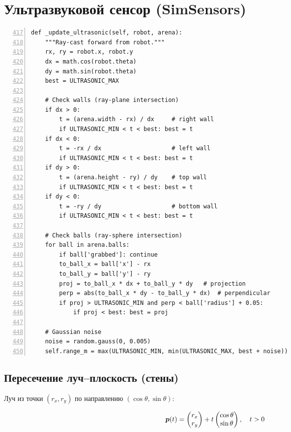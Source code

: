 \section{Ультразвуковой сенсор (SimSensors)}

\begin{filebox}[title={\filepath{simulator.py}, строки 417--464 --- \_update\_ultrasonic()}]
\begin{lstlisting}[style=pythonstyle, numbers=left, firstnumber=417]
def _update_ultrasonic(self, robot, arena):
    """Ray-cast forward from robot."""
    rx, ry = robot.x, robot.y
    dx = math.cos(robot.theta)
    dy = math.sin(robot.theta)
    best = ULTRASONIC_MAX

    # Check walls (ray-plane intersection)
    if dx > 0:
        t = (arena.width - rx) / dx     # right wall
        if ULTRASONIC_MIN < t < best: best = t
    if dx < 0:
        t = -rx / dx                    # left wall
        if ULTRASONIC_MIN < t < best: best = t
    if dy > 0:
        t = (arena.height - ry) / dy    # top wall
        if ULTRASONIC_MIN < t < best: best = t
    if dy < 0:
        t = -ry / dy                    # bottom wall
        if ULTRASONIC_MIN < t < best: best = t

    # Check balls (ray-sphere intersection)
    for ball in arena.balls:
        if ball['grabbed']: continue
        to_ball_x = ball['x'] - rx
        to_ball_y = ball['y'] - ry
        proj = to_ball_x * dx + to_ball_y * dy   # projection
        perp = abs(to_ball_x * dy - to_ball_y * dx)  # perpendicular
        if proj > ULTRASONIC_MIN and perp < ball['radius'] + 0.05:
            if proj < best: best = proj

    # Gaussian noise
    noise = random.gauss(0, 0.005)
    self.range_m = max(ULTRASONIC_MIN, min(ULTRASONIC_MAX, best + noise))
\end{lstlisting}
\end{filebox}

\subsection{Пересечение луч--плоскость (стены)}

Луч из точки $(r_x, r_y)$ по направлению $(\cos\theta, \sin\theta)$:

\begin{equation}
  \bm{p}(t) = \begin{pmatrix} r_x \\ r_y \end{pmatrix}
  + t \begin{pmatrix} \cos\theta \\ \sin\theta \end{pmatrix}, \quad t > 0
  \label{eq:ray_def}
\end{equation}

